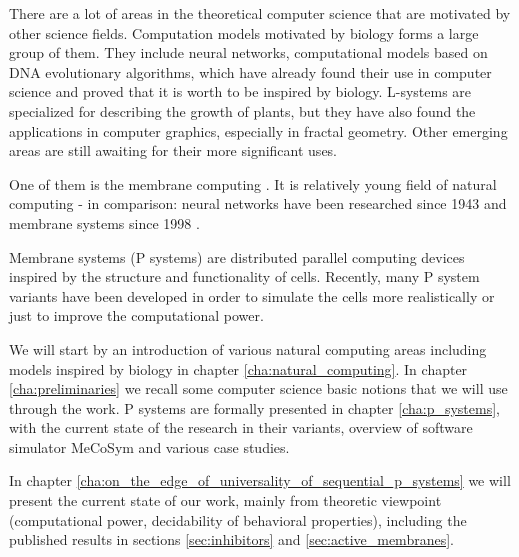
There are a lot of areas in the theoretical computer science that are motivated by other science fields. Computation models motivated by biology forms a large group of them. They include neural networks, computational models based on DNA evolutionary algorithms, which have already found their use in computer science and proved that it is worth to be inspired by biology. L-systems are specialized for describing the growth of plants, but they have also found the applications in computer graphics, especially in fractal geometry. Other emerging areas are still awaiting for their more significant uses.

One of them is the membrane computing \cite{Paun10OxfordHandbookMembraneComputing}. It is relatively young field of natural computing - in comparison: neural networks have been researched since 1943 and membrane systems since 1998 \cite{Paun98}.

Membrane systems (P systems) are distributed parallel computing devices inspired by the structure and functionality of cells. Recently, many P system variants have been developed in order to simulate the cells more realistically or just to improve the computational power.

We will start by an introduction of various natural computing areas including models inspired by biology in chapter \ref{cha:natural_computing}. In chapter \ref{cha:preliminaries} we recall some computer science basic notions that we will use through the work. P systems are formally presented in chapter \ref{cha:p_systems}, with the current state of the research in their variants, overview of software simulator MeCoSym and various case studies.

In chapter \ref{cha:on_the_edge_of_universality_of_sequential_p_systems} we will present the current state of our work, mainly from theoretic viewpoint (computational power, decidability of behavioral properties), including the published results in sections \ref{sec:inhibitors} and \ref{sec:active_membranes}.
